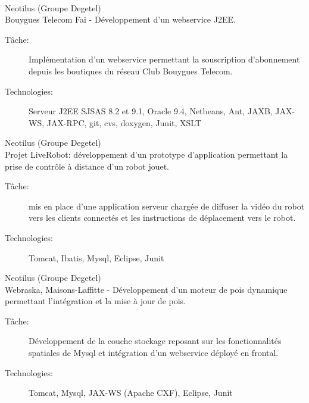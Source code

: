 \documentclass[11pt, oneside, a4paper, french]{article}
\begin{document}
 \vspace{1cm}


\textbf{
  \Large{
  }
}\\

\begin{description}
\setlength{\itemsep}{25pt}

\item[depuis Ao\^ut 2008:] Neotilus (Groupe Degetel)\\
  Bouygues Telecom Fai - D\'eveloppement d'un webservice J2EE.
  \begin{description}
  \item[T\^ache:] Impl\'ementation d'un webservice permettant la souscription d'abonnement depuis les boutiques du r\'eseau Club Bouygues Telecom.
  \item[Technologies:] Serveur J2EE SJSAS 8.2 et 9.1, Oracle 9.4, Netbeans, Ant,
 JAXB, JAX-WS, JAX-RPC, git, cvs, doxygen, Junit, XSLT
  \end{description}

\item[Juin 2008 - Juillet 2008 :] Neotilus (Groupe Degetel)\\
  Projet LiveRobot: d\'eveloppement d'un prototype d'application permettant la prise de contrôle à distance d'un robot jouet. 
  \begin{description}
  \item[T\^ache:] mis en place d'une application serveur chargée de diffuser la vidéo du robot vers les clients connectés et les instructions de déplacement vers le robot.
  \item[Technologies:] Tomcat, Ibatis, Mysql, Eclipse, Junit 
  \end{description}

\item[F\'evrier 2008 - Mai 2008:]  Neotilus (Groupe Degetel)\\
Webraska, Maisons-Laffitte - D\'eveloppement d'un moteur de pois dynamique permettant l'int\'egration et la mise \`a jour de pois.
  \begin{description}
  \item[T\^ache:] D\'eveloppement de la couche stockage reposant sur les fonctionnalités spatiales de Mysql et intégration d'un webservice d\'eploy\'e en frontal.
  \item[Technologies:] Tomcat, Mysql, JAX-WS (Apache CXF), Eclipse, Junit
  \end{description}



\end{description}
\end{document}
